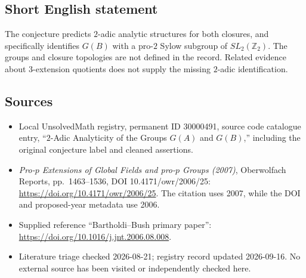 \documentclass[11pt]{article}
\newcommand{\Z}{\mathbb{Z}}
\begin{document}
\subsection{Short English statement}
The conjecture predicts \(2\)-adic analytic structures for both closures, and specifically identifies \(G(B)\) with a pro-\(2\) Sylow subgroup of \(SL_2(\Z_2)\). The groups and closure topologies are not defined in the record. Related evidence about \(3\)-extension quotients does not supply the missing \(2\)-adic identification.
\subsection{Sources}
\begin{itemize}
\item Local UnsolvedMath registry, permanent ID 30000491, source code catalogue entry, ``\(2\)-Adic Analyticity of the Groups \(G(A)\) and \(G(B)\),'' including the original conjecture label and cleaned assertions.
\item \emph{Pro-\(p\) Extensions of Global Fields and pro-\(p\) Groups (2007)}, Oberwolfach Reports, pp.\ 1463--1536, DOI 10.4171/owr/2006/25: \url{https://doi.org/10.4171/owr/2006/25}. The citation uses 2007, while the DOI and proposed-year metadata use 2006.
\item Supplied reference ``Bartholdi--Bush primary paper'': \url{https://doi.org/10.1016/j.jnt.2006.08.008}.
\item Literature triage checked 2026-08-21; registry record updated 2026-09-16. No external source has been visited or independently checked here.
\end{itemize}
\end{document}
